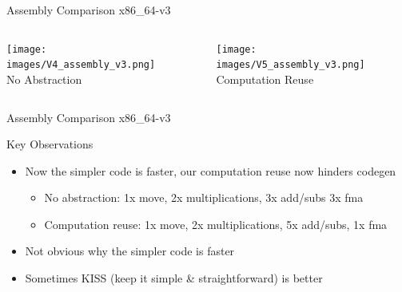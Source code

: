 \documentclass{beamer}
\begin{document}
\begin{frame}{Assembly Comparison x86\_64-v3}
    \begin{columns}
        \begin{column}{0.45\textwidth}
            \centering
            \texttt{[image: images/V4\_assembly\_v3.png]}
            \\
            \footnotesize No Abstraction
        \end{column}
        \hfill
        \begin{column}{0.45\textwidth}
            \centering
            \texttt{[image: images/V5\_assembly\_v3.png]}
            \\
            \footnotesize Computation Reuse
        \end{column}
    \end{columns}
\end{frame}

\begin{frame}{Assembly Comparison x86\_64-v3}
    \begin{block}{Key Observations}
        \begin{itemize}
            \item Now the simpler code is faster, our computation reuse now hinders codegen
            \begin{itemize}
                \item No abstraction: 1x move, 2x multiplications, 3x add/subs 3x fma
                \item Computation reuse: 1x move, 2x multiplications, 5x add/subs, 1x fma
            \end{itemize}
            \item Not obvious why the simpler code is faster
            \item Sometimes KISS (keep it simple \& straightforward) is better
        \end{itemize}
    \end{block}
\end{frame}
\end{document}
